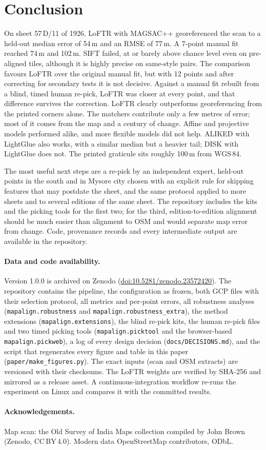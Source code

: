 \documentclass[10pt,twocolumn]{article}
\newcommand{\metre}{\,m}
\begin{document}
\section{Conclusion}
On sheet 57\,D/11 of 1926, LoFTR with MAGSAC++ georeferenced the scan to a held-out median error of 54\metre{} and an RMSE of 77\metre. A 7-point manual fit reached 74\metre{} and 102\metre. SIFT failed, at or barely above chance level even on pre-aligned tiles, although it is highly precise on same-style pairs. The comparison favours LoFTR over the original manual fit, but with 12 points and after correcting for secondary tests it is not decisive. Against a manual fit rebuilt from a blind, timed human re-pick, LoFTR was closer at every point, and that difference survives the correction. LoFTR clearly outperforms georeferencing from the printed corners alone. The matchers contribute only a few metres of error; most of it comes from the map and a century of change. Affine and projective models performed alike, and more flexible models did not help. ALIKED with LightGlue also works, with a similar median but a heavier tail; DISK with LightGlue does not. The printed graticule sits roughly 100\metre{} from WGS\,84.

The most useful next steps are a re-pick by an independent expert, held-out points in the south and in Mysore city chosen with an explicit rule for skipping features that may postdate the sheet, and the same protocol applied to more sheets and to several editions of the same sheet. The repository includes the kits and the picking tools for the first two; for the third, edition-to-edition alignment should be much easier than alignment to OSM and would separate map error from change. Code, provenance records and every intermediate output are available in the repository.

\paragraph{Data and code availability.}
Version 1.0.0 is archived on Zenodo (\href{https://doi.org/10.5281/zenodo.23572420}{doi:10.5281/zenodo.23572420}). The repository contains the pipeline, the configuration as frozen, both GCP files with their selection protocol, all metrics and per-point errors, all robustness analyses (\texttt{mapalign.robustness} and \texttt{mapalign.robustness\_extra}), the method extensions (\texttt{mapalign.extensions}), the blind re-pick kits, the human re-pick files and two timed picking tools (\texttt{mapalign.picktool} and the browser-based \texttt{mapalign.pickweb}), a log of every design decision (\texttt{docs/DECISIONS.md}), and the script that regenerates every figure and table in this paper (\texttt{paper/make\_figures.py}). The exact inputs (scan and OSM extracts) are versioned with their checksums. The LoFTR weights are verified by SHA-256 and mirrored as a release asset. A continuous-integration workflow re-runs the experiment on Linux and compares it with the committed results.

\paragraph{Acknowledgements.}
Map scan: the Old Survey of India Maps collection compiled by John Brown (Zenodo, CC\,BY\,4.0). Modern data \textcopyright{} OpenStreetMap contributors, ODbL.

\small


\end{document}
